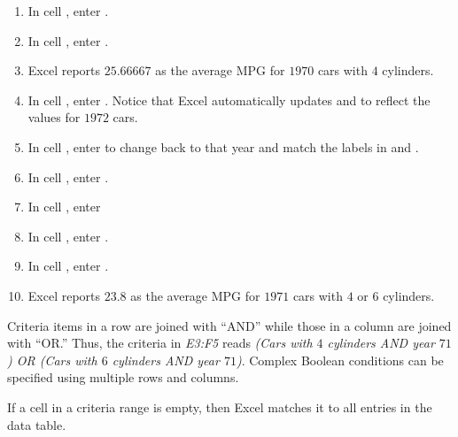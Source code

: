 \begin{enumbox}
\begin{enumerate}
		\item In cell , enter .
		\item In cell , enter .
		\item Excel reports $ 25.66667 $ as the average MPG for $ 1970 $ cars with $ 4 $ cylinders.
		
		\item In cell , enter . Notice that Excel automatically updates  and  to reflect the values for $ 1972 $ cars.
		\item In cell , enter  to change back to that year and match the labels in  and .
	
		\item In cell , enter .
		\item In cell , enter 
		\item In cell , enter .
		\item In cell , enter .
		\item Excel reports $ 23.8 $ as the average MPG for $ 1971 $ cars with $ 4 $ or $ 6 $ cylinders. 
	\end{enumerate}	
\end{enumbox}
	
Criteria items in a row are joined with ``AND'' while those in a column are joined with ``OR.'' Thus, the criteria in \textit{E3:F5} reads \textit{(Cars with $ 4 $ cylinders AND year $ 71 $) OR (Cars with $ 6 $ cylinders AND year $ 71 $)}. Complex Boolean conditions can be specified using multiple rows and columns.

If a cell in a criteria range is empty, then Excel matches it to all entries in the data table.


